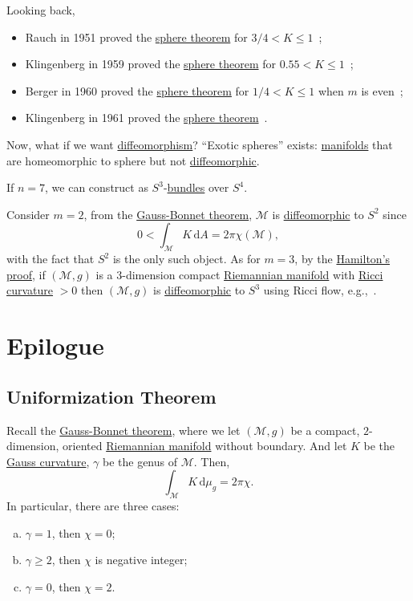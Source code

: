 Looking back,
\begin{itemize}
	\item Rauch in 1951 proved the \hyperref[thm:sphere*]{sphere theorem} for \(3 / 4 < K \leq 1\)~\cite{10.2307/1969309};
	\item Klingenberg in 1959 proved the \hyperref[thm:sphere*]{sphere theorem} for \(0.55 < K \leq 1\)~\cite{10.2307/1970029};
	\item Berger in 1960 proved the \hyperref[thm:sphere*]{sphere theorem} for \(1 / 4 < K \leq 1\) when \(m\) is even~\cite{berger1960varietes};
	\item Klingenberg in 1961 proved the \hyperref[thm:sphere*]{sphere theorem}~\cite{Klingenberg1961}.
\end{itemize}

Now, what if we want \hyperref[def:diffeomorphism]{diffeomorphism}? ``Exotic spheres'' exists: \hyperref[def:smooth-manifold]{manifolds} that are homeomorphic to sphere but not \hyperref[def:diffeomorphic]{diffeomorphic}.

\begin{eg}[J. Milnor]
	If \(n = 7\), we can construct as \(S^3\)-\hyperref[def:bundle]{bundles} over \(S^4\).
\end{eg}

Consider \(m = 2\), from the \hyperref[thm:Gauss-Bonnet]{Gauss-Bonnet theorem}, \(\mathcal{M} \) is \hyperref[def:diffeomorphic]{diffeomorphic} to \(S^2\) since
\[
	0 < \int _\mathcal{M} K \,\mathrm{d} A = 2 \pi \chi (\mathcal{M} ),
\]
with the fact that \(S^2\) is the only such object. As for \(m = 3\), by the \hyperref[thm:Hamilton]{Hamilton's proof}, if \((\mathcal{M} , g)\) is a \(3\)-dimension compact \hyperref[def:Riemannian-manifold]{Riemannian manifold} with \hyperref[def:Ricci-curvature]{Ricci curvature} \(> 0\) then \((\mathcal{M} , g)\) is \hyperref[def:diffeomorphic]{diffeomorphic} to \(S^3\) using Ricci flow, e.g.,~\cite{brendle2008manifolds}.

\chapter{Epilogue}
\section{Uniformization Theorem}
Recall the \hyperref[thm:Gauss-Bonnet]{Gauss-Bonnet theorem}, where we let \((\mathcal{M} , g)\) be a compact, \(2\)-dimension, oriented \hyperref[def:Riemannian-manifold]{Riemannian manifold} without boundary. And let \(K\) be the \hyperref[rmk:Gauss-curvature]{Gauss curvature}, \(\gamma \) be the genus of \(\mathcal{M} \). Then,
\[
	\int _\mathcal{M} K \,\mathrm{d} \mu _g = 2 \pi \chi .
\]
In particular, there are three cases:
\begin{enumerate}[(a)]
	\item \(\gamma = 1\), then \(\chi = 0\);
	\item \(\gamma \geq 2\), then \(\chi\) is negative integer;
	\item \(\gamma = 0\), then \(\chi = 2\).
\end{enumerate}

